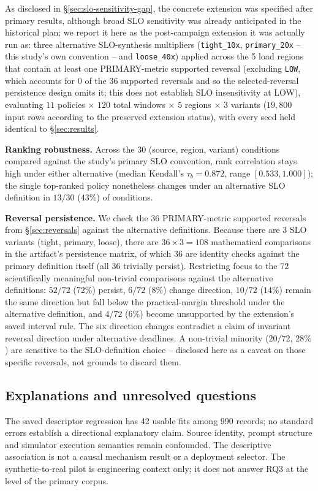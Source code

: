 As disclosed in \S\ref{sec:slo-sensitivity-gap}, the concrete extension was specified after primary results, although
broad SLO sensitivity was already anticipated in the historical plan; we report it here as the post-campaign
extension it was actually run as: three alternative SLO-synthesis
multipliers (\texttt{tight\_10x}, \texttt{primary\_20x} -- this study's own
convention -- and \texttt{loose\_40x}) applied across the 5 load regions
that contain at least one PRIMARY-metric supported reversal (excluding
\texttt{LOW}, which accounts for 0 of the 36 supported reversals and so
the selected-reversal persistence design omits it; this does not establish
SLO insensitivity at LOW), evaluating $11$
policies $\times$ $120$ total windows $\times$ $5$ regions $\times$ $3$
variants ($19{,}800$ input rows according to the preserved extension status), with every seed held identical to
\S\ref{sec:results}.

\textbf{Ranking robustness.} Across the $30$ (source, region, variant)
conditions compared against the study's primary SLO convention, rank
correlation stays high under either alternative (median Kendall's
$\tau_b = 0.872$, range $[0.533, 1.000]$); the single top-ranked policy
nonetheless changes under an alternative SLO definition in $13/30$ ($43\%$)
of conditions.

\textbf{Reversal persistence.} We check the 36 PRIMARY-metric supported reversals from \S\ref{sec:reversals} against the alternative definitions. Because there are 3 SLO variants (tight, primary, loose), there are $36 \times 3 = 108$ mathematical comparisons in the artifact's persistence matrix, of which $36$ are identity checks against the primary definition itself (all 36 trivially persist). Restricting focus to the $72$ scientifically meaningful non-trivial comparisons against the alternative definitions: $52/72$ ($72\%$) persist, $6/72$ ($8\%$) change direction, $10/72$ ($14\%$) remain the same direction but fall below the practical-margin threshold under the alternative definition, and $4/72$ ($6\%$) become unsupported by the extension's saved interval rule. The six direction changes contradict a claim of invariant reversal direction under alternative deadlines. A non-trivial minority ($20/72$, $28\%$) are sensitive to the SLO-definition
choice -- disclosed here as a caveat on those specific reversals, not
grounds to discard them.


\subsection{Explanations and unresolved questions}\label{sec:telemetry-explanation}\label{sec:results-rq3-pilot}\label{sec:slo-sensitivity-gap}
The saved descriptor regression has 42 usable fits among 990 records;
no standard errors establish a directional explanatory claim. Source
identity, prompt structure and simulator execution semantics remain
confounded. The descriptive association is not a causal mechanism result
or a deployment selector. The synthetic-to-real pilot is engineering
context only; it does not answer RQ3 at the level of the primary corpus.

